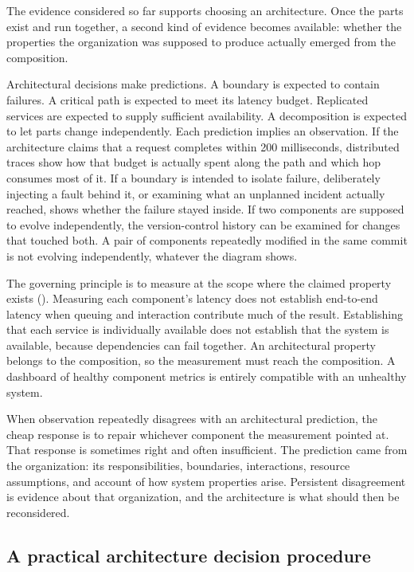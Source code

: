 The evidence considered so far supports choosing an architecture. Once the parts exist and run
together, a second kind of evidence becomes available: whether the properties the organization was
supposed to produce actually emerged from the composition.

Architectural decisions make predictions. A boundary is expected to contain failures. A critical path
is expected to meet its latency budget. Replicated services are expected to supply sufficient
availability. A decomposition is expected to let parts change independently. Each prediction implies
an observation. If the architecture claims that a request completes within 200 milliseconds,
distributed traces show how that budget is actually spent along the path and which hop consumes most
of it. If a boundary is intended to isolate failure, deliberately injecting a fault behind it, or
examining what an unplanned incident actually reached, shows whether the failure stayed inside. If
two components are supposed to evolve independently, the version-control history can be examined for
changes that touched both. A pair of components repeatedly modified in the same commit is not
evolving independently, whatever the diagram shows.

The governing principle is to measure at the scope where the claimed property exists
(\citet{sec-scope-of-property}). Measuring each component's latency does not establish end-to-end latency
when queuing and interaction contribute much of the result. Establishing that each service is
individually available does not establish that the system is available, because dependencies can fail
together. An architectural property belongs to the composition, so the measurement must reach the
composition. A dashboard of healthy component metrics is entirely compatible with an unhealthy
system.

When observation repeatedly disagrees with an architectural prediction, the cheap response is to
repair whichever component the measurement pointed at. That response is sometimes right and often
insufficient. The prediction came from the organization: its responsibilities, boundaries,
interactions, resource assumptions, and account of how system properties arise. Persistent
disagreement is evidence about that organization, and the architecture is what should then be
reconsidered.

\subsection{A practical architecture decision procedure}\label{sec-decision-procedure}

